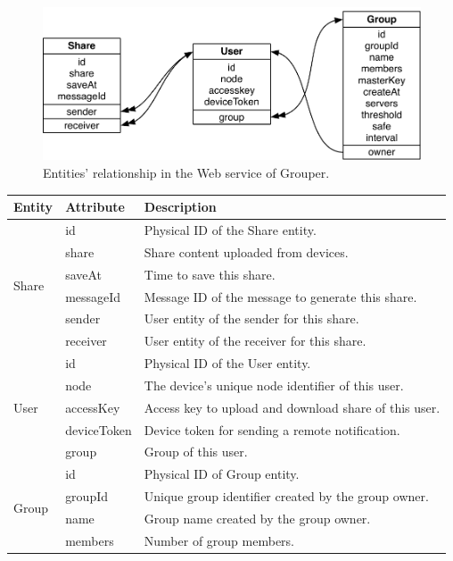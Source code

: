 \documentclass[a4paper,11pt]{report}
\begin{document}
\begin{figure}
	\centering
	\includegraphics[scale=0.75]{server_entities}
	\caption{Entities' relationship in the Web service of Grouper.}
	\label{fig:server_entities}
\end{figure}

\begin{table}[t]
	\centering
	\begin{tabular}{@{}lll@{}}
		\toprule
		\textbf{Entity} & \textbf{Attribute} & \textbf{Description} \\ \midrule
		\multirow{6}{*}{Share} & id & Physical ID of the Share entity. \\
		& share & Share content uploaded from devices. \\ 
		& saveAt & Time to save this share. \\
		& messageId & Message ID of the message to generate this share.\\
		& sender & User entity of the sender for this share. \\
		& receiver & User entity of the receiver for this share.  \\
		\hline
		\multirow{5}{*}{User} & id & Physical ID of the User entity. \\
		& node & The device's unique node identifier of this user. \\
		& accessKey & Access key to upload and download share of this user. \\
		& deviceToken & Device token for sending a remote notification. \\
		& group & Group of this user.  \\
		\hline
		\multirow{11}{*}{Group} & id & Physical ID of Group entity. \\
		& groupId & Unique group identifier created by the group owner. \\
		& name & Group name created by the group owner. \\
		& members & Number of group members. \\

\end{tabular}
\end{table}
\end{document}

